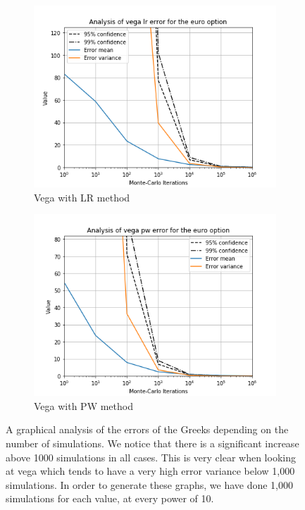 \documentclass[11pt,a4paper,fleqn]{article}
\begin{document}
\begin{figure}
      \begin{subfigure}[b]{0.45\textwidth}
          \includegraphics[width=\textwidth]{graphs/eurovegalr.png}
          \caption{Vega with LR method}
      \end{subfigure}
      \begin{subfigure}[b]{0.45\textwidth}
          \includegraphics[width=\textwidth]{graphs/eurovegapw.png}
          \caption{Vega with PW method}
      \end{subfigure}

      \caption{\label{fig:eurographs}A graphical analysis of the errors of the Greeks depending on the number of simulations. We notice that there is a significant increase above 1000 simulations in all cases. This is very clear when looking at vega which tends to have a very high error variance below 1,000 simulations. In order to generate these graphs, we have done 1,000 simulations for each value, at every power of 10.}
\end{figure}
\end{document}
